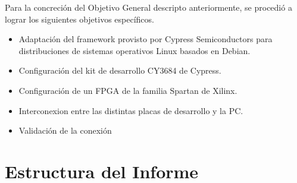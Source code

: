     Para la concreción del Objetivo General descripto anteriormente, se procedió a lograr los siguientes objetivos específicos.

      \begin{itemize}
        \item Adaptación del framework provisto por Cypress Semiconductors para distribuciones de sistemas operativos Linux
          basados en Debian.
        \item Configuración del kit de desarrollo CY3684 de Cypress.
        \item Configuración de un FPGA de la familia Spartan de Xilinx.
        \item Interconexion entre las distintas placas de desarrollo y la PC.
        \item Validación de la conexión
      \end{itemize}

  \section{Estructura del Informe}
